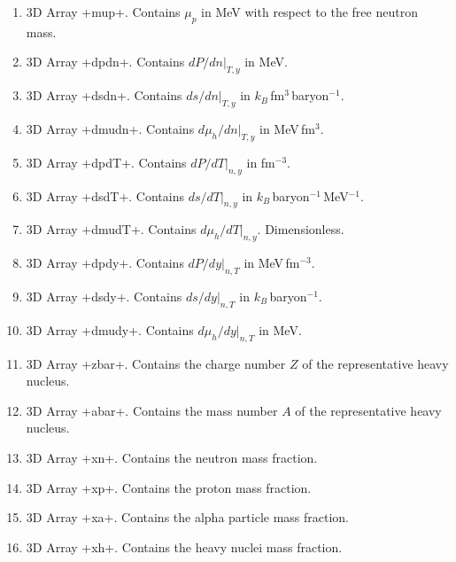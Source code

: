 \documentclass[letterpaper,11pt]{refart}
\begin{document}
\begin{enumerate}
 \item 3D Array \verbprm+mup+. Contains $\mu_p$ in MeV with respect to the
   free neutron mass.

 \item 3D Array \verbprm+dpdn+. Contains $dP/dn\vert_{T,y}$ in MeV.  

 \item 3D Array
   \verbprm+dsdn+. Contains $ds/dn\vert_{T,y}$ in $k_B$\,fm$^3$\,baryon$^{-1}$. 

 \item 3D Array \verbprm+dmudn+. Contains $d\mu_h/dn\vert_{T,y}$ in MeV\,fm$^3$. 

 \item 3D Array \verbprm+dpdT+. Contains $dP/dT\vert_{n,y}$ in fm$^{-3}$.

 \item 3D Array
   \verbprm+dsdT+. Contains $ds/dT\vert_{n,y}$ in $k_B$\,baryon$^{-1}$\,MeV$^{-1}$.

 \item 3D Array
   \verbprm+dmudT+. Contains $d\mu_h/dT\vert_{n,y}$. Dimensionless. 

 \item 3D Array \verbprm+dpdy+. Contains $dP/dy\vert_{n,T}$ in MeV\,fm$^{-3}$.

 \item 3D Array \verbprm+dsdy+. Contains $ds/dy\vert_{n,T}$ in  $k_B$\,baryon$^{-1}$.

 \item 3D Array
   \verbprm+dmudy+. Contains $d\mu_h/dy\vert_{n,T}$ in MeV. 

 \item 3D Array
   \verbprm+zbar+. Contains the charge number $Z$ of the representative
   heavy nucleus.

 \item 3D Array
   \verbprm+abar+. Contains the mass number $A$ of the representative
   heavy nucleus.

 \item 3D Array
   \verbprm+xn+. Contains the neutron mass fraction.

 \item 3D Array \verbprm+xp+. Contains the proton mass fraction.

 \item 3D Array \verbprm+xa+. Contains the alpha particle mass fraction.

 \item 3D Array \verbprm+xh+. Contains the heavy nuclei mass fraction.


\end{enumerate}
\end{document}
